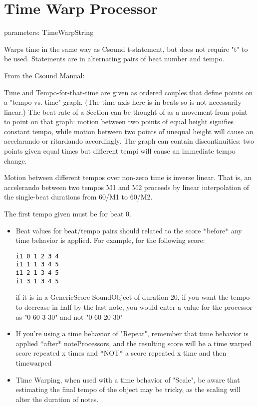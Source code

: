 \section{Time Warp Processor}\label{timewarpProcessor}

parameters: TimeWarpString

Warps time in the same way as Csound t-statement, but does not require
"t" to be used. Statements are in alternating pairs of beat number and
tempo.

From the Csound Manual:

Time and Tempo-for-that-time are given as ordered couples that define
points on a "tempo vs. time" graph. (The time-axis here is in beats so
is not necessarily linear.) The beat-rate of a Section can be thought of
as a movement from point to point on that graph: motion between two
points of equal height signifies constant tempo, while motion between
two points of unequal height will cause an accelarando or ritardando
accordingly. The graph can contain discontinuities: two points given
equal times but different tempi will cause an immediate tempo change.

Motion between different tempos over non-zero time is inverse linear.
That is, an accelerando between two tempos M1 and M2 proceeds by linear
interpolation of the single-beat durations from 60/M1 to 60/M2.

The first tempo given must be for beat 0.

\begin{itemize}
\item
  Beat values for beat/tempo pairs should related to the score *before*
  any time behavior is applied. For example, for the following score:

\begin{verbatim}
i1 0 1 2 3 4
i1 1 1 3 4 5 
i1 2 1 3 4 5 
i1 3 1 3 4 5 
\end{verbatim}

  if it is in a GenericScore SoundObject of duration 20, if you want the
  tempo to decrease in half by the last note, you would enter a value
  for the processor as "0 60 3 30" and not "0 60 20 30"
\item
  If you're using a time behavior of "Repeat", remember that time
  behavior is applied *after* noteProcessors, and the resulting score
  will be a time warped score repeated x times and *NOT* a score
  repeated x time and then timewarped
\item
  Time Warping, when used with a time behavior of "Scale", be aware that
  estimating the final tempo of the object may be tricky, as the scaling
  will alter the duration of notes.
\end{itemize}

